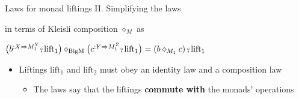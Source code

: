 \documentclass[english]{beamer}
\newcommand{\bef}{\ensuremath\raisebox{2pt}{$\mathsmaller{\mathsmaller{\circ}}$}\hspace{-3.3pt},}
\begin{document}
\begin{frame}{Laws for monad liftings II. Simplifying the laws}
\begin{itemize}
in terms of Kleisli composition $\diamond_{M}$ as
\end{itemize}
\begin{center}
{\footnotesize{}\vspace{-0.2cm}\hspace{-0.0cm}$\big(b^{:X\Rightarrow M_{1}^{Y}}\bef\text{lift}_{1}\big)\diamond_{\text{BigM}}\big(c^{:Y\Rightarrow M_{1}^{Z}}\bef\text{lift}_{1}\big)=\left(b\diamond_{M_{1}}c\right)\bef\text{lift}_{1}$}{\footnotesize\par}
\par\end{center}
\begin{itemize}
\item {\footnotesize{}\vspace{-0.3cm}\hspace{-0.0cm}}Liftings $\text{lift}_{1}$
and $\text{lift}_{2}$ must obey an identity law and a composition
law
\begin{itemize}
\item The laws say that the liftings \textbf{commute with} the monads' operations
\end{itemize}
\end{itemize}
\end{frame}
\end{document}
